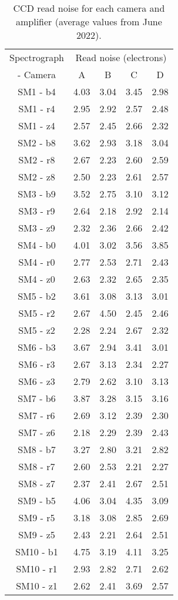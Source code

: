 \begin{table}[h]
\centering
\small
\begin{tabular}{ccccc}
Spectrograph & \multicolumn{4}{c}{Read noise (electrons)} \\
- Camera & A & B & C & D \\
\hline

SM1 - b4 & 4.03 & 3.04 & 3.45 & 2.98\\
SM1 - r4 & 2.95 & 2.92 & 2.57 & 2.48\\
SM1 - z4 & 2.57 & 2.45 & 2.66 & 2.32\\
SM2 - b8 & 3.62 & 2.93 & 3.18 & 3.04\\
SM2 - r8 & 2.67 & 2.23 & 2.60 & 2.59\\
SM2 - z8 & 2.50 & 2.23 & 2.61 & 2.57\\
SM3 - b9 & 3.52 & 2.75 & 3.10 & 3.12\\
SM3 - r9 & 2.64 & 2.18 & 2.92 & 2.14\\
SM3 - z9 & 2.32 & 2.36 & 2.66 & 2.42\\
SM4 - b0 & 4.01 & 3.02 & 3.56 & 3.85\\
SM4 - r0 & 2.77 & 2.53 & 2.71 & 2.43\\
SM4 - z0 & 2.63 & 2.32 & 2.65 & 2.35\\
SM5 - b2 & 3.61 & 3.08 & 3.13 & 3.01\\
SM5 - r2 & 2.67 & 4.50 & 2.45 & 2.46\\
SM5 - z2 & 2.28 & 2.24 & 2.67 & 2.32\\
SM6 - b3 & 3.67 & 2.94 & 3.41 & 3.01\\
SM6 - r3 & 2.67 & 3.13 & 2.34 & 2.27\\
SM6 - z3 & 2.79 & 2.62 & 3.10 & 3.13\\
SM7 - b6 & 3.87 & 3.28 & 3.15 & 3.16\\
SM7 - r6 & 2.69 & 3.12 & 2.39 & 2.30\\
SM7 - z6 & 2.18 & 2.29 & 2.39 & 2.43\\
SM8 - b7 & 3.27 & 2.80 & 3.21 & 2.82\\
SM8 - r7 & 2.60 & 2.53 & 2.21 & 2.27\\
SM8 - z7 & 2.37 & 2.41 & 2.67 & 2.51\\
SM9 - b5 & 4.06 & 3.04 & 4.35 & 3.09\\
SM9 - r5 & 3.18 & 3.08 & 2.85 & 2.69\\
SM9 - z5 & 2.43 & 2.21 & 2.64 & 2.51\\
SM10 - b1 & 4.75 & 3.19 & 4.11 & 3.25\\
SM10 - r1 & 2.93 & 2.82 & 2.71 & 2.62\\
SM10 - z1 & 2.62 & 2.41 & 3.69 & 2.57\\
\end{tabular}
\caption{CCD read noise for each camera and amplifier (average values from June 2022).}
\label{table:spectrographs-ccd-rdnoise-table}
\end{table}

